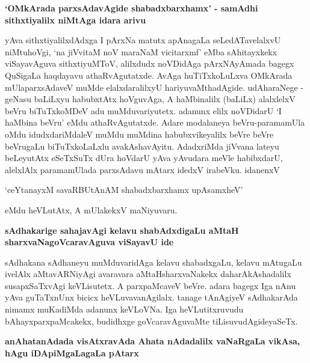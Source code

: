 {\bigskip
\noindent
{\large\bf `OMkArada parxsAdavAgide shabadxbarxhamx' - samAdhi sithxtiyalilx niMtAga idara arivu}}\label{page203}
\medskip

\noindent
yAva sithxtiyalilxdAdxga I pArxNa matutx apAnagaLa seLedATavelalxvU niMtuhoVgi, `na jiVvitaM noV maraNaM vicitarxmf' eMba sAhitayxkekx viSayavAguva sithxtiyuMToV, alilxdudx noVDidAga pArxNAyAmada bagegx QuSigaLa haqdayavu athaRvAgutatxde. AvAga huTiTxkoLuLxva OMkArada mUlaparxsAdaveV muMde elalxdaralilxyU hariyuvaMthadAgide. udAharaNege - geNasu baLiLxyu habubxtAtx hoVguvAga, A haMbinalilx (baLiLx) alalxlelxV beVru biTuTxkoMDeV adu muMduvariyutetx. adanunx elilx noVDidarU `I haMbina beVru' eMdu athaRvAgutatxde. Adare modalaneya beVru-paramamUla oMdu idudxdariMdaleV muMdu muMdina habubxvikeyalilx beVre beVre beVrugaLu biTuTxkoLaLxlu avakAshavAyitu. AdadxriMda jiVvana lateyu beLeyutAtx eSeTxSuTx dUra hoVdarU yAva yAvudara meVle habibxdarU, alelxlAlx paramamUlada parxsAdavu mAtarx idedxV irabeVku. idanenxV

\begin{artha}
`ceYtanayxM savaRBUtAnAM shabadxbarxhamx upAsamxheV' 
\end{artha}

\noindent
eMdu heVLutAtx, A mUlakekxV maNiyuvaru.\label{203}

{\bigskip
\noindent
{\large\bf sAdhakarige sahajavAgi kelavu shabAdxdigaLu aMtaH sharxvaNagoVcaravAguva viSayavU ide}}\label{page203a}
\medskip

\noindent
sAdhakana sAdhaneyu muMduvaridAga kelavu shabadxgaLu, kelavu mAtugaLu ivelAlx aMtavARNiyAgi avaravara aMtaHsharxvaNakekx daharAkAshadalilx susapxSaTxvAgi keVLisutetx. A parxpaMcaveV beVre. adara bagegx Iga nAnu yAva guTaTxnUnx bicicx heVLuvavanAgilalx. tanage tAnAgiyeV sAdhakarAda nimamx muKadiMda adanunx keVLoVNa. Iga heVLutitxruvudu bAhayxparxpaMcakekx, budidhxge goVcaravAguvaMte tiLisuvudAgideyaSeTx.

{\bigskip
\noindent
{\large\bf anAhatanAdada visAtxravAda Ahata nAdadalilx vaNaRgaLa vikAsa, hAgu iDApiMgaLagaLa pAtarx}}\label{page211}
\medskip

